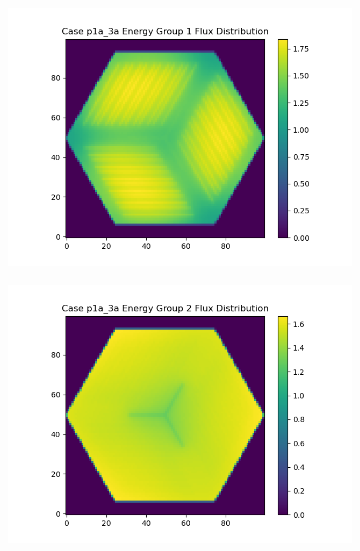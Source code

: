 \documentclass[letterpaper,11pt]{report}
\begin{document}
    \begin{figure}[H]
        \centering
          \begin{subfigure}{.33\textwidth}
            \centering
            \includegraphics[width=1.1\linewidth]{../../phase1a/case3a/analysis_output/p1a_3a_e_eg1.png}
            \caption{}
          \end{subfigure}%
          \begin{subfigure}{.33\textwidth}
            \centering
            \includegraphics[width=1.1\linewidth]{../../phase1a/case3a/analysis_output/p1a_3a_e_eg2.png}
            \caption{}
          \end{subfigure}
          \begin{subfigure}{.33\textwidth}

\end{subfigure}
\end{figure}
\end{document}

